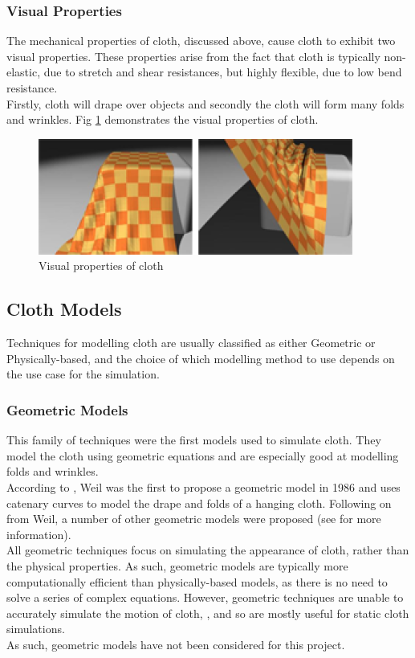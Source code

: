 \subsubsection{Visual Properties}
\label{sec:visual properties}
The mechanical properties of cloth, discussed above, cause cloth to exhibit two visual properties. These properties arise from the fact that cloth is typically non-elastic, due to stretch and shear resistances, but highly flexible, due to low bend resistance.
\\Firstly, cloth will drape over objects and secondly the cloth will form many folds and wrinkles. Fig \ref{fig:visual properties} demonstrates the visual properties of cloth.
\begin{figure}[tp]
   \begin{center}
     \includegraphics{Figures/visual_properties}
   \end{center}
   \caption[Visual Properties of cloth]{Visual properties of cloth \parencite[1]{Yalcn}}
   \label{fig:visual properties}
\end{figure}

\subsection{Cloth Models}
Techniques for modelling cloth are usually classified as either Geometric or Physically-based, and the choice of which modelling method to use depends on the use case for the simulation.

\subsubsection{Geometric Models}
This family of techniques were the first models used to simulate cloth. They model the cloth using geometric equations and are especially good at modelling folds and wrinkles.
\\According to \textcite{Ng1996}, Weil was the first to propose a geometric model in 1986 and uses catenary curves to model the drape and folds of a hanging cloth. Following on from Weil, a number of other geometric models were proposed (see \textcite{Ng1996} for more information).
\\All geometric techniques focus on simulating the appearance of cloth, rather than the physical properties. As such, geometric models are typically more computationally efficient than physically-based models, as there is no need to solve a series of complex equations. However, geometric techniques are unable to accurately simulate the motion of cloth, \parencites{Mongus2012}{Zhang2001}{Xinrong2009}, and so are mostly useful for static cloth simulations.
\\As such, geometric models have not been considered for this project.

